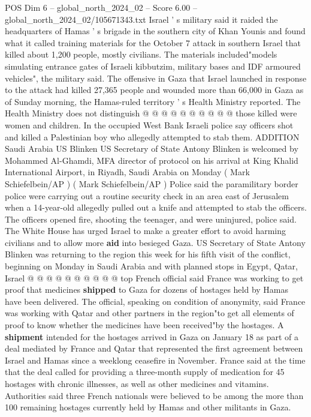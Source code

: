 \begin{textsample}{POS Dim 6 – global\_north\_2024\_02 – Score 6.00 – global\_north\_2024\_02/105671343.txt}
Israel ' s military said it raided the headquarters of Hamas ' s brigade in the southern city of Khan Younis and found what it called training materials for the October 7 attack in southern Israel that killed about 1,200 people, mostly civilians.
The materials included"models simulating entrance gates of Israeli kibbutzim, military bases and IDF armoured vehicles", the military said.
The offensive in Gaza that Israel launched in response to the attack had killed 27,365 people and wounded more than 66,000 in Gaza as of Sunday morning, the Hamas-ruled territory ' s Health Ministry reported.
The Health Ministry does not distinguish @ @ @ @ @ @ @ @ @ @ those killed were women and children.
In the occupied West Bank Israeli police say officers shot and killed a Palestinian boy who allegedly attempted to stab them.
ADDITION Saudi Arabia US Blinken US Secretary of State Antony Blinken is welcomed by Mohammed Al-Ghamdi, MFA director of protocol on his arrival at King Khalid International Airport, in Riyadh, Saudi Arabia on Monday ( Mark Schiefelbein/AP ) ( Mark Schiefelbein/AP ) Police said the paramilitary border police were carrying out a routine security check in an area east of Jerusalem when a 14-year-old allegedly pulled out a knife and attempted to stab the officers.
The officers opened fire, shooting the teenager, and were uninjured, police said.
The White House has urged Israel to make a greater effort to avoid harming civilians and to allow more \textbf{aid} into besieged Gaza.
US Secretary of State Antony Blinken was returning to the region this week for his fifth visit of the conflict, beginning on Monday in Saudi Arabia and with planned stops in Egypt, Qatar, Israel @ @ @ @ @ @ @ @ @ @ top French official said France was working to get proof that medicines \textbf{shipped} to Gaza for dozens of hostages held by Hamas have been delivered.
The official, speaking on condition of anonymity, said France was working with Qatar and other partners in the region"to get all elements of proof to know whether the medicines have been received"by the hostages.
A \textbf{shipment} intended for the hostages arrived in Gaza on January 18 as part of a deal mediated by France and Qatar that represented the first agreement between Israel and Hamas since a weeklong ceasefire in November.
France said at the time that the deal called for providing a three-month supply of medication for 45 hostages with chronic illnesses, as well as other medicines and vitamins.
Authorities said three French nationals were believed to be among the more than 100 remaining hostages currently held by Hamas and other militants in Gaza.

\end{textsample}
